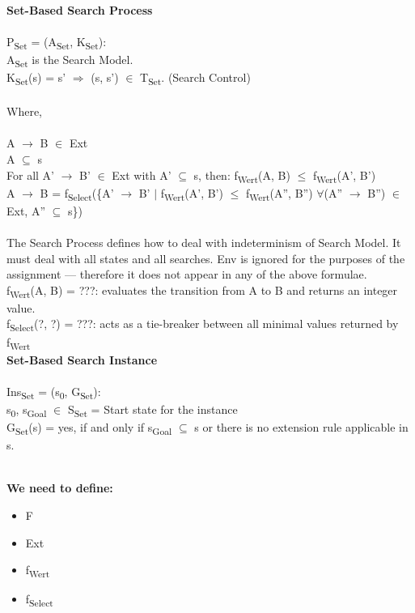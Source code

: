 \documentclass[10pt, oneside]{article}   	%
\begin{document}
\noindent \textbf{Set-Based Search Process}\\\\
P\textsubscript{Set} = (A\textsubscript{Set}, K\textsubscript{Set}):\\
\indent A\textsubscript{Set} is the Search Model.\\
\indent K\textsubscript{Set}(s) = s' $\Rightarrow$ (s, s') $\in$ T\textsubscript{Set}. (Search Control)\\\\
Where,\\\\
A $\rightarrow$ B $\in$ Ext\\ 
A $\subseteq$ s\\
For all A' $\rightarrow$ B' $\in$ Ext with A' $\subseteq$ s, then: f\textsubscript{Wert}(A, B) $\leq$ f\textsubscript{Wert}(A', B')\\
A $\rightarrow$ B = f\textsubscript{Select}(\{A' $\rightarrow$ B' $\vert$ f\textsubscript{Wert}(A', B') $\leq$ f\textsubscript{Wert}(A'', B'') $\forall$(A'' $\rightarrow$ B'') $\in$ Ext, A'' $\subseteq$ s\})\\\\
The Search Process defines how to deal with indeterminism of Search Model. It must deal with all states and all searches. Env is ignored for the purposes of the assignment --- therefore it does not appear in any of the above formulae.\\

\noindent f\textsubscript{Wert}(A, B) = ???: evaluates the transition from A to B and returns an integer value.\\

\noindent f\textsubscript{Select}(?, ?) = ???: acts as a tie-breaker between all minimal values returned by f\textsubscript{Wert}\\

\noindent \textbf{Set-Based Search Instance}\\\\
Ins\textsubscript{Set} = (s\textsubscript{0}, G\textsubscript{Set}):\\
\indent s\textsubscript{0}, s\textsubscript{Goal} $\in$ S\textsubscript{Set} = Start state for the instance\\
\indent G\textsubscript{Set}(s) = yes, if and only if s\textsubscript{Goal} $\subseteq$ s or there is no extension rule applicable in s.

\noindent \textbf{\\We need to define:}
\begin{itemize}[topsep=0pt]
\item F
\item Ext
\item f\textsubscript{Wert}
\item f\textsubscript{Select}
\end{itemize}
\newpage
\end{document}
